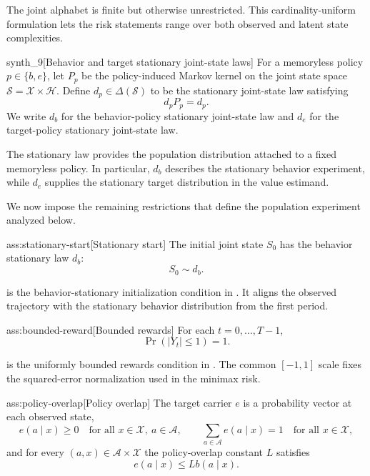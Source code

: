 The joint alphabet  is finite but otherwise unrestricted. This cardinality-uniform formulation lets the risk statements range over both observed and latent state complexities.

\begin{definitionv}{synth_9}[Behavior and target stationary joint-state laws]
For a memoryless policy \(p\in\{b,e\}\), let \(P_p\) be the policy-induced Markov kernel on the joint state space \(\mathcal S=\mathcal X\times\mathcal H\). Define \(d_p\in\Delta(\mathcal S)\) to be the stationary joint-state law satisfying
\[
d_pP_p=d_p .
\]
We write \(d_b\) for the behavior-policy stationary joint-state law and \(d_e\) for the target-policy stationary joint-state law.
\end{definitionv}

The stationary law  provides the population distribution attached to a fixed memoryless policy. In particular, \(d_b\) describes the stationary behavior experiment, while \(d_e\) supplies the stationary target distribution in the value estimand.

We now impose the remaining restrictions that define the population experiment analyzed below.

\begin{assumptionv}{ass:stationary-start}[Stationary start]
The initial joint state \(S_0\) has the behavior stationary law \(d_b\):
\[
S_0\sim d_b.
\]
\end{assumptionv}

 is the behavior-stationary initialization condition in \citet{HuWager2023}. It aligns the observed trajectory with the stationary behavior distribution from the first period.

\begin{assumptionv}{ass:bounded-reward}[Bounded rewards]
For each \(t=0,\ldots,T-1\),
\[
\Pr(|Y_t|\le 1)=1.
\]
\end{assumptionv}

 is the uniformly bounded rewards condition in \citet{HuWager2023}. The common \([-1,1]\) scale fixes the squared-error normalization used in the minimax risk.

\begin{assumptionv}{ass:policy-overlap}[Policy overlap]
The target carrier \(e\) is a probability vector at each observed state,
\[
e(a\mid x)\ge 0
\quad\text{for all }x\in\mathcal X,\ a\in\mathcal A,
\qquad
\sum_{a\in\mathcal A} e(a\mid x)=1
\quad\text{for all }x\in\mathcal X,
\]
and for every \((a,x)\in\mathcal A\times\mathcal X\) the policy-overlap constant \(L\) satisfies
\[
e(a\mid x)\le L b(a\mid x).
\]
\end{assumptionv}

